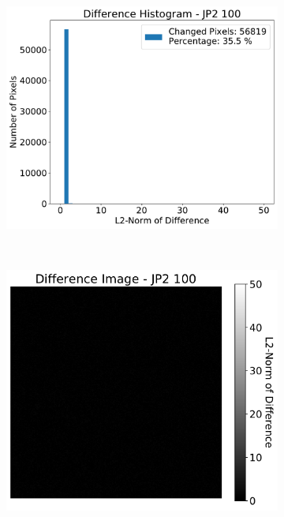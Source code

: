 \begin{figure}[htb]
\begin{subfigure}[b]{0.48\textwidth}
        \includegraphics[width=\textwidth]{doc/thesis/0_figures/compare_quality/set1/jp2_100_center_diff_histogram}
        \caption{}
        \label{fig:img_quality_comp_jp2_100_center_histo}
    \end{subfigure}
    \\
    \begin{subfigure}[b]{0.48\textwidth}
        \centering
        \includegraphics[width=\textwidth]{doc/thesis/0_figures/compare_quality/set1/jp2_100_center_diff_heatmap}

\end{subfigure}
\end{figure}
